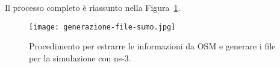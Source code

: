 Il processo completo è riassunto nella Figura~\ref{fig:generazione-file-sumo}.
\begin{figure}[htbp]
	\centering
		\texttt{[image: generazione-file-sumo.jpg]}
\caption{Procedimento per estrarre le informazioni da OSM e generare i file per la simulazione con ns-3.\label{fig:generazione-file-sumo}}
\end{figure}
